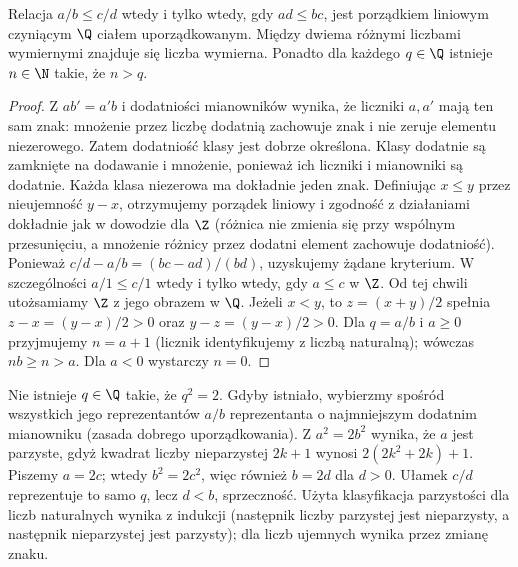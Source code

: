 \begin{twierdzenie}
\label{ma1:thm:rational-order}
Relacja $a/b\le c/d$ wtedy i tylko wtedy, gdy $ad\le bc$, jest porządkiem liniowym czyniącym $\Q$ ciałem uporządkowanym. Między dwiema różnymi liczbami wymiernymi znajduje się liczba wymierna. Ponadto dla każdego $q\in\Q$ istnieje $n\in\N$ takie, że $n>q$.
\end{twierdzenie}
\begin{proof}
Z $ab'=a'b$ i dodatniości mianowników wynika, że liczniki $a,a'$ mają ten sam znak: mnożenie przez liczbę dodatnią zachowuje znak i nie zeruje elementu niezerowego. Zatem dodatniość klasy jest dobrze określona. Klasy dodatnie są zamknięte na dodawanie i mnożenie, ponieważ ich liczniki i mianowniki są dodatnie. Każda klasa niezerowa ma dokładnie jeden znak. Definiując $x\le y$ przez nieujemność $y-x$, otrzymujemy porządek liniowy i zgodność z działaniami dokładnie jak w dowodzie dla $\Z$ (różnica nie zmienia się przy wspólnym przesunięciu, a mnożenie różnicy przez dodatni element zachowuje dodatniość). Ponieważ $c/d-a/b=(bc-ad)/(bd)$, uzyskujemy żądane kryterium. W szczególności $a/1\le c/1$ wtedy i tylko wtedy, gdy $a\le c$ w $\Z$. Od tej chwili utożsamiamy $\Z$ z jego obrazem w $\Q$.
Jeżeli $x<y$, to $z=(x+y)/2$ spełnia $z-x=(y-x)/2>0$ oraz $y-z=(y-x)/2>0$. Dla $q=a/b$ i $a\ge0$ przyjmujemy $n=a+1$ (licznik identyfikujemy z liczbą naturalną); wówczas $nb\ge n>a$. Dla $a<0$ wystarczy $n=0$.
\end{proof}
\begin{przyklad}
\label{ma1:ex:sqrt-two}
Nie istnieje $q\in\Q$ takie, że $q^2=2$. Gdyby istniało, wybierzmy spośród wszystkich jego reprezentantów $a/b$ reprezentanta o najmniejszym dodatnim mianowniku (zasada dobrego uporządkowania). Z $a^2=2b^2$ wynika, że $a$ jest parzyste, gdyż kwadrat liczby nieparzystej $2k+1$ wynosi $2(2k^2+2k)+1$. Piszemy $a=2c$; wtedy $b^2=2c^2$, więc również $b=2d$ dla $d>0$. Ułamek $c/d$ reprezentuje to samo $q$, lecz $d<b$, sprzeczność. Użyta klasyfikacja parzystości dla liczb naturalnych wynika z indukcji (następnik liczby parzystej jest nieparzysty, a następnik nieparzystej jest parzysty); dla liczb ujemnych wynika przez zmianę znaku.
\end{przyklad}
